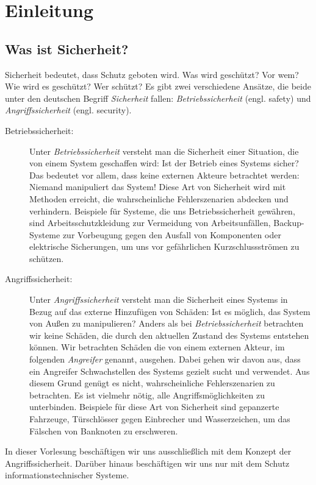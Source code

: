\chapter{Einleitung}
\label{cha:intro}

\section{Was ist Sicherheit?}
Sicherheit bedeutet, dass Schutz geboten wird. Was wird geschützt? Vor
wem? Wie wird es geschützt? Wer schützt? Es gibt zwei verschiedene
Ansätze, die beide unter den deutschen Begriff \emph{Sicherheit} fallen:
\emph{Betriebssicherheit} (engl. safety) und \emph{Angriffssicherheit}
(engl. security).
\begin{description}
\item[Betriebssicherheit:] Unter \emph{Betriebssicherheit}
  versteht man die Sicherheit einer Situation, die von einem System
  geschaffen wird: Ist der Betrieb eines Systems sicher? Das bedeutet vor
  allem, dass keine externen Akteure betrachtet werden: Niemand
  manipuliert das System! Diese Art von Sicherheit wird mit Methoden
  erreicht, die wahrscheinliche Fehlerszenarien abdecken und
  verhindern. Beispiele für Systeme, die uns Betriebssicherheit gewähren,
  sind Arbeitsschutzkleidung zur Vermeidung von Arbeitsunfällen,
  Backup-Systeme zur Vorbeugung gegen den Ausfall von Komponenten oder
  elektrische Sicherungen, um uns vor gefährlichen Kurzschlussströmen zu
  schützen.
\item[Angriffssicherheit:] Unter \emph{Angriffssicherheit}
  versteht man die Sicherheit eines Systems in Bezug auf das externe
  Hinzufügen von Schäden: Ist es möglich, das System von Außen zu
  manipulieren? Anders als bei \emph{Betriebssicherheit} betrachten wir
  keine Schäden, die durch den aktuellen Zustand des Systems entstehen
  können. Wir betrachten Schäden die von einem externen Akteur, im
  folgenden \emph{Angreifer} genannt, ausgehen. Dabei gehen wir davon aus,
  dass ein Angreifer Schwachstellen des Systems gezielt sucht und
  verwendet. Aus diesem Grund genügt es nicht, wahrscheinliche
  Fehlerszenarien zu betrachten. Es ist vielmehr nötig, alle
  Angriffsmöglichkeiten zu unterbinden. Beispiele für diese Art von
  Sicherheit sind gepanzerte Fahrzeuge, Türschlösser gegen Einbrecher und
  Wasserzeichen, um das Fälschen von Banknoten zu erschweren.
\end{description} 
In dieser Vorlesung beschäftigen wir uns
ausschließlich mit dem Konzept der Angriffssicherheit. Darüber hinaus
beschäftigen wir uns nur mit dem Schutz informationstechnischer Systeme.

